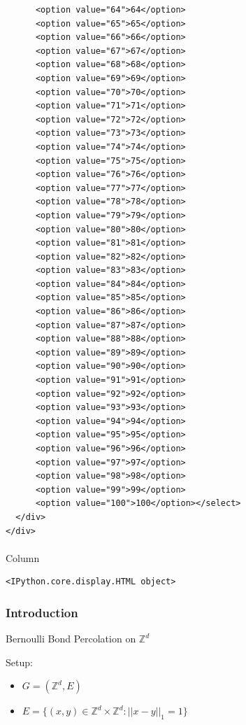 \documentclass[
  letterpaper,
  DIV=11,
  numbers=noendperiod]{scrartcl}
\makeatletter
\let\oldparagraph\paragraph
\renewcommand{\paragraph}{
    \@ifstar
      \xxxParagraphStar
      \xxxParagraphNoStar
  }
\newcommand{\xxxParagraphStar}[1]{\oldparagraph*{#1}\mbox{}}
\newcommand{\xxxParagraphNoStar}[1]{\oldparagraph{#1}\mbox{}}
\providecommand{\tightlist}{%
  \setlength{\itemsep}{0pt}\setlength{\parskip}{0pt}}\usepackage{longtable,booktabs,array}
\makeatother
\begin{document}
\begin{verbatim}
      <option value="64">64</option>
      <option value="65">65</option>
      <option value="66">66</option>
      <option value="67">67</option>
      <option value="68">68</option>
      <option value="69">69</option>
      <option value="70">70</option>
      <option value="71">71</option>
      <option value="72">72</option>
      <option value="73">73</option>
      <option value="74">74</option>
      <option value="75">75</option>
      <option value="76">76</option>
      <option value="77">77</option>
      <option value="78">78</option>
      <option value="79">79</option>
      <option value="80">80</option>
      <option value="81">81</option>
      <option value="82">82</option>
      <option value="83">83</option>
      <option value="84">84</option>
      <option value="85">85</option>
      <option value="86">86</option>
      <option value="87">87</option>
      <option value="88">88</option>
      <option value="89">89</option>
      <option value="90">90</option>
      <option value="91">91</option>
      <option value="92">92</option>
      <option value="93">93</option>
      <option value="94">94</option>
      <option value="95">95</option>
      <option value="96">96</option>
      <option value="97">97</option>
      <option value="98">98</option>
      <option value="99">99</option>
      <option value="100">100</option></select>
  </div>
</div>
\end{verbatim}

\paragraph{Column}\label{column}

\label{shiny_percolation_plot}
\begin{verbatim}
<IPython.core.display.HTML object>
\end{verbatim}

\subsubsection{Introduction}\label{introduction}

Bernoulli Bond Percolation on \(\mathbb{Z}^d\)

Setup:

\begin{itemize}
\tightlist
\item
  \(G = (\mathbb{Z}^d, E)\)
\item
  \(E = \{(x, y) \in \mathbb{Z}^d \times \mathbb{Z}^d : ||x - y||_1 = 1\}\)
\end{itemize}
\end{document}
